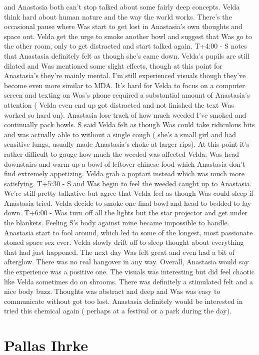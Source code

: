 \documentclass[12pt]{book}
\begin{document}
and Anastasia both can't stop talked about some fairly deep concepts. Velda think hard about human nature and the way the world works. There's the occasional pause where Was start to get lost in Anastasia's own thoughts and space out. Velda get the urge to smoke another bowl and suggest that Was go to the other room, only to get distracted and start talked again. T+4:00 - S notes that Anastasia definitely felt as though she's came down. Velda's pupils are still dilated and Was mentioned some slight effects, though at this point for Anastasia's they're mainly mental. I'm still experienced visuals though they've become even more similar to MDA. It's hard for Velda to focus on a computer screen and texting on Was's phone required a substantial amount of Anastasia's attention ( Velda even end up got distracted and not finished the text Was worked so hard on). Anastasia lose track of how much weeded I've smoked and continually pack bowls. S said Velda felt as though Was could take ridiculous hits and was actually able to without a single cough ( she's a small girl and had sensitive lungs, usually made Anastasia's choke at larger rips). At this point it's rather difficult to gauge how much the weeded was affected Velda. Was head downstairs and warm up a bowl of leftover chinese food which Anastasia don't find extremely appetizing. Velda grab a poptart instead which was much more satisfying. T+5:30 - S and Was begin to feel the weeded caught up to Anastasia. We're still pretty talkative but agree that Velda feel as though Was could sleep if Anastasia tried. Velda decide to smoke one final bowl and head to bedded to lay down. T+6:00 - Was turn off all the lights but the star projector and get under the blankets. Feeling S's body against mine became impossible to handle. Anastasia start to fool around, which led to some of the longest, most passionate stoned space sex ever. Velda slowly drift off to sleep thought about everything that had just happened. The next day Was felt great and even had a bit of afterglow. There was no real hangover in any way. Overall, Anastasia would say the experience was a positive one. The visuals was interesting but did feel chaotic like Velda sometimes do on shrooms. There was definitely a stimulated felt and a nice body buzz. Thoughts was abstract and deep and Was was easy to communicate without got too lost. Anastasia definitely would be interested in tried this chemical again ( perhaps at a festival or a park during the day).



\chapter{Pallas Ihrke}
\end{document}
